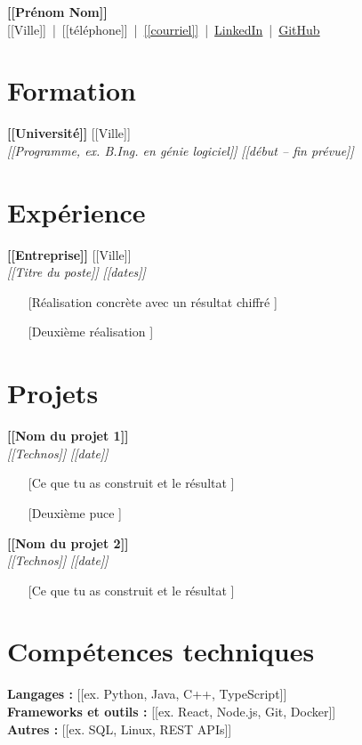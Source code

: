 \documentclass[10pt,letterpaper]{article}
\newcommand{\entry}[4]{\textbf{#1} \hfill #2\\ \textit{#3} \hfill \textit{#4}}
\begin{document}
\begin{center}
{\LARGE\bfseries [[Prénom Nom]]}\\[2pt]
[[Ville]] \,|\, [[téléphone]] \,|\, \href{mailto:[[courriel]]}{[[courriel]]} \,|\, \href{[[lien LinkedIn]]}{LinkedIn} \,|\, \href{[[lien GitHub]]}{GitHub}
\end{center}

\section{Formation}
\entry{[[Université]]}{[[Ville]]}{[[Programme, ex. B.Ing. en génie logiciel]]}{[[début -- fin prévue]]}

\section{Expérience}
\entry{[[Entreprise]]}{[[Ville]]}{[[Titre du poste]]}{[[dates]]}
\begin{itemize}
  \item [[Réalisation concrète avec un résultat chiffré]]
  \item [[Deuxième réalisation]]
\end{itemize}

\section{Projets}
\entry{[[Nom du projet 1]]}{}{[[Technos]]}{[[date]]}
\begin{itemize}
  \item [[Ce que tu as construit et le résultat]]
  \item [[Deuxième puce]]
\end{itemize}
\entry{[[Nom du projet 2]]}{}{[[Technos]]}{[[date]]}
\begin{itemize}
  \item [[Ce que tu as construit et le résultat]]
\end{itemize}

\section{Compétences techniques}
\textbf{Langages :} [[ex. Python, Java, C++, TypeScript]]\\
\textbf{Frameworks et outils :} [[ex. React, Node.js, Git, Docker]]\\
\textbf{Autres :} [[ex. SQL, Linux, REST APIs]]
\end{document}
